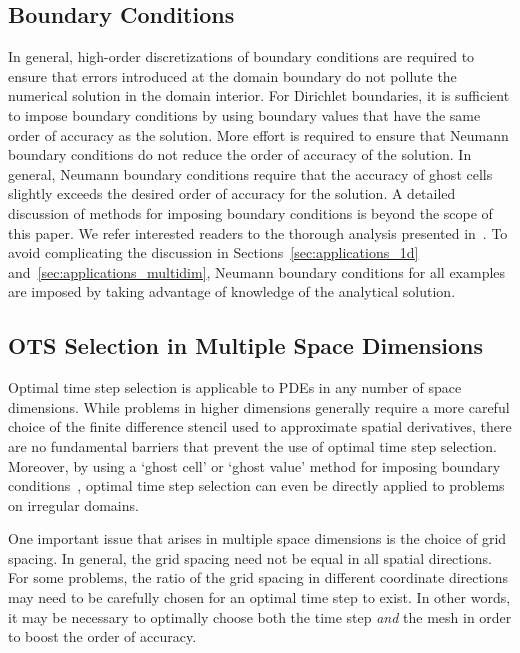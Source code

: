 \documentclass[fleqn,12pt,twoside]{article}
\begin{document}
\subsection{Boundary Conditions}
In general, high-order discretizations of boundary conditions are required 
to ensure that errors introduced at the domain boundary do not pollute 
the numerical solution in the domain interior.  For Dirichlet boundaries, 
it is sufficient to impose boundary conditions by using boundary values 
that have the same order of accuracy as the solution.  More effort is 
required to ensure that Neumann boundary conditions do not reduce the order 
of accuracy of the solution.  In general, Neumann boundary conditions require 
that the accuracy of ghost cells slightly exceeds the desired order of 
accuracy for the solution.  A detailed discussion of methods for imposing 
boundary conditions is beyond the scope of this paper.  We refer interested 
readers to the thorough analysis presented in~\cite{gko_book}.  To avoid 
complicating the discussion in Sections~\ref{sec:applications_1d} 
and~\ref{sec:applications_multidim}, Neumann boundary conditions for
all examples are imposed by taking advantage of knowledge of the analytical 
solution.


\subsection{\label{sec:ots_higher_spatial_dims}
            OTS Selection in Multiple Space Dimensions}
Optimal time step selection is applicable to PDEs in any number of space
dimensions.  While problems in higher dimensions generally require a more 
careful choice of the finite difference stencil used to approximate spatial 
derivatives, there are no fundamental barriers that prevent the use of optimal 
time step selection.  Moreover, by using a `ghost cell' or `ghost value' 
method for imposing boundary 
conditions~\cite{gibou_2005,ito_2005,fedkiw_1999,osher_fedkiw_book},
optimal time step selection can even be directly applied to problems on 
irregular domains.  

One important issue that arises in multiple space dimensions is the choice
of grid spacing.  In general, the grid spacing need not be equal in all 
spatial directions.  For some problems, the ratio of the grid spacing in
different coordinate directions may need to be carefully chosen for an 
optimal time step to exist.  In other words, it may be necessary to optimally 
choose both the time step \emph{and} the mesh in order to boost the order 
of accuracy.
\end{document}
